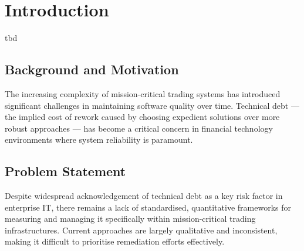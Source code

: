 \documentclass[
  11pt,
  letterpaper,
  11pt,
  oneside,
  english,
  onehalfspacing,
  headsepline]{MastersDoctoralThesis}
\begin{document}
\clearpage





\clearpage





\mainmatter %

\pagestyle{thesis} %
\newcommand{\keyword}[1]{\textbf{#1}}
\newcommand{\tabhead}[1]{\textbf{#1}}
\newcommand{\code}[1]{\texttt{#1}}
\newcommand{\file}[1]{\texttt{\bfseries#1}}
\newcommand{\option}[1]{\texttt{\itshape#1}}



\chapter{Introduction}\label{introduction}

tbd

\section{Background and Motivation}\label{background-and-motivation}

The increasing complexity of mission-critical trading systems has
introduced significant challenges in maintaining software quality over
time. Technical debt --- the implied cost of rework caused by choosing
expedient solutions over more robust approaches --- has become a
critical concern in financial technology environments where system
reliability is paramount.

\section{Problem Statement}\label{problem-statement}

Despite widespread acknowledgement of technical debt as a key risk
factor in enterprise IT, there remains a lack of standardised,
quantitative frameworks for measuring and managing it specifically
within mission-critical trading infrastructures. Current approaches are
largely qualitative and inconsistent, making it difficult to prioritise
remediation efforts effectively.
\end{document}
